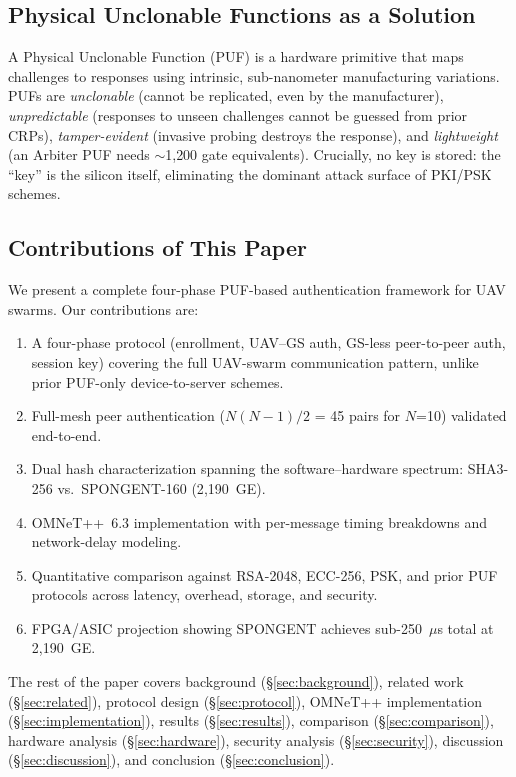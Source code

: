 \documentclass[11pt,a4paper]{article}
\begin{document}
\subsection{Physical Unclonable Functions as a Solution}

A Physical Unclonable Function (PUF) is a hardware primitive that maps challenges to responses using intrinsic, sub-nanometer manufacturing variations. PUFs are \emph{unclonable} (cannot be replicated, even by the manufacturer), \emph{unpredictable} (responses to unseen challenges cannot be guessed from prior CRPs), \emph{tamper-evident} (invasive probing destroys the response), and \emph{lightweight} (an Arbiter PUF needs $\sim$1{,}200 gate equivalents). Crucially, no key is stored: the ``key'' is the silicon itself, eliminating the dominant attack surface of PKI/PSK schemes.

\subsection{Contributions of This Paper}

We present a complete four-phase PUF-based authentication framework for UAV swarms. Our contributions are:
\begin{enumerate}[leftmargin=*]
    \item A four-phase protocol (enrollment, UAV--GS auth, GS-less peer-to-peer auth, session key) covering the full UAV-swarm communication pattern, unlike prior PUF-only device-to-server schemes.
    \item Full-mesh peer authentication ($N(N-1)/2$ = 45 pairs for $N$=10) validated end-to-end.
    \item Dual hash characterization spanning the software--hardware spectrum: SHA3-256 vs.\ SPONGENT-160 (2{,}190~GE).
    \item OMNeT++~6.3 implementation with per-message timing breakdowns and network-delay modeling.
    \item Quantitative comparison against RSA-2048, ECC-256, PSK, and prior PUF protocols across latency, overhead, storage, and security.
    \item FPGA/ASIC projection showing SPONGENT achieves sub-250~$\mu$s total at 2{,}190~GE.
\end{enumerate}

The rest of the paper covers background (\S\ref{sec:background}), related work (\S\ref{sec:related}), protocol design (\S\ref{sec:protocol}), OMNeT++ implementation (\S\ref{sec:implementation}), results (\S\ref{sec:results}), comparison (\S\ref{sec:comparison}), hardware analysis (\S\ref{sec:hardware}), security analysis (\S\ref{sec:security}), discussion (\S\ref{sec:discussion}), and conclusion (\S\ref{sec:conclusion}).
\end{document}
